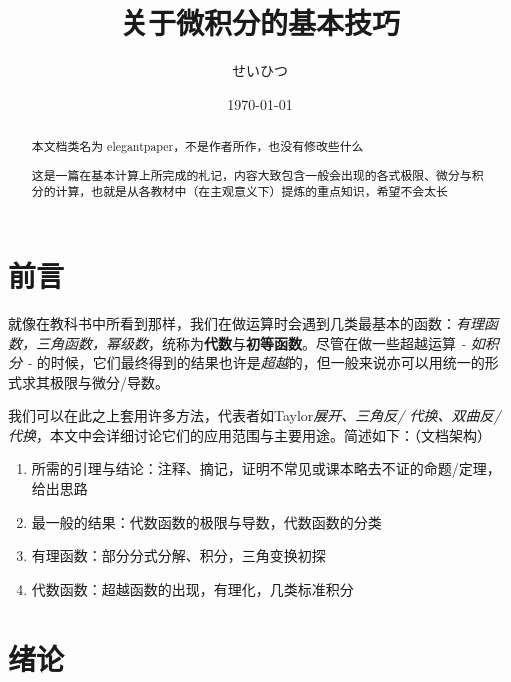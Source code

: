 \documentclass[lang=cn,11pt]{elegantpaper}
\title{关于微积分的基本技巧}
\author{%
	{せいひつ}}
\date{\today}
\newcommand{\tit}[1]{\textit{#1}}
\newcommand{\tbf}[1]{\textbf{#1}}
\newcommand{\trm}[1]{\textrm{#1}}
\begin{document}
\maketitle

\begin{abstract}
\begin{center} 本文档类名为 \lstinline{}{elegantpaper}，不是作者所作，也没有修改些什么 \end{center}
\noindent 这是一篇在基本计算上所完成的札记，内容大致包含一般会出现的各式极限、微分与积分的计算，也就是从各教材中（在主观意义下）提炼的重点知识，希望不会太长
\end{abstract}

\section{前言}
就像在教科书中所看到那样，我们在做运算时会遇到几类最基本的函数：\tit{有理函数，三角函数，幂级数}，统称为\tbf{代数}与\tbf{初等函数}。尽管在做一些超越运算 \tit{- 如积分 -} 的时候，它们最终得到的结果也许是\tit{超越}的，但一般来说亦可以用统一的形式求其极限与微分/导数。

我们可以在此之上套用许多方法，代表者如\trm{Taylor}\tit{展开、三角反/%
代换、双曲反/代换}，本文中会详细讨论它们的应用范围与主要用途。简述如下：（文档架构）
\begin{enumerate}
	\item 所需的引理与结论：注释、摘记，证明不常见或课本略去不证的命题/定理，给出思路
	\item 最一般的结果：代数函数的极限与导数，代数函数的分类
	\item 有理函数：部分分式分解、积分，三角变换初探
	\item 代数函数：超越函数的出现，有理化，几类标准积分
\end{enumerate}

\section{绪论}
\end{document}
